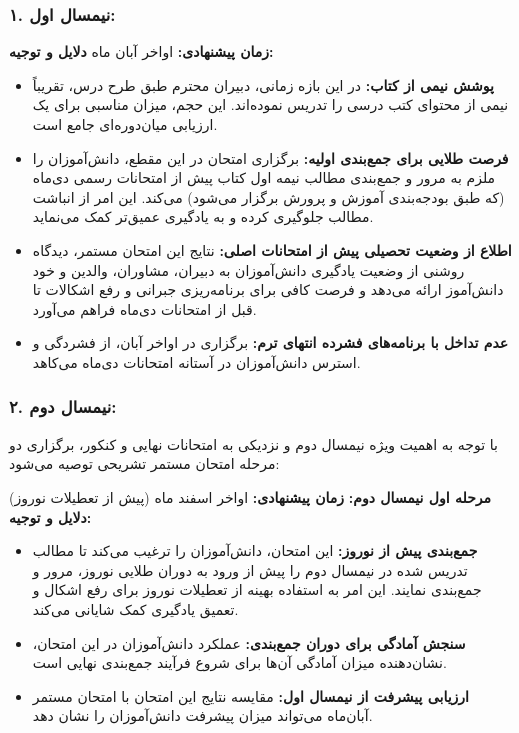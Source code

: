 \documentclass[a4paper,14pt]{article}
\begin{document}
\subsubsection*{۱. نیمسال اول:}
\textbf{زمان پیشنهادی:} اواخر آبان ماه
\newline\textbf{دلایل و توجیه:}
\begin{itemize}
    \item \textbf{پوشش نیمی از کتاب:}  در این بازه زمانی، دبیران محترم طبق طرح درس، تقریباً نیمی از محتوای کتب درسی را تدریس نموده‌اند. این حجم، میزان مناسبی برای یک ارزیابی میان‌دوره‌ای جامع است.
    \item \textbf{فرصت طلایی برای جمع‌بندی اولیه:} برگزاری امتحان در این مقطع، دانش‌آموزان را ملزم به مرور و جمع‌بندی مطالب نیمه اول کتاب پیش از امتحانات رسمی دی‌ماه (که طبق بودجه‌بندی آموزش و پرورش برگزار می‌شود) می‌کند. این امر از انباشت مطالب جلوگیری کرده و به یادگیری عمیق‌تر کمک می‌نماید.
    \item \textbf{اطلاع از وضعیت تحصیلی پیش از امتحانات اصلی:} نتایج این امتحان مستمر، دیدگاه روشنی از وضعیت یادگیری دانش‌آموزان به دبیران، مشاوران، والدین و خود دانش‌آموز ارائه می‌دهد و فرصت کافی برای برنامه‌ریزی جبرانی و رفع اشکالات تا قبل از امتحانات دی‌ماه فراهم می‌آورد.
    \item \textbf{عدم تداخل با برنامه‌های فشرده انتهای ترم:} برگزاری در اواخر آبان، از فشردگی و استرس دانش‌آموزان در آستانه امتحانات دی‌ماه می‌کاهد.
\end{itemize}
\medskip

\subsubsection*{۲. نیمسال دوم:}
با توجه به اهمیت ویژه نیمسال دوم و نزدیکی به امتحانات نهایی و کنکور، برگزاری دو مرحله امتحان مستمر تشریحی توصیه می‌شود:
\medskip

\textbf{مرحله اول نیمسال دوم:}
\newline\textbf{زمان پیشنهادی:} اواخر اسفند ماه (پیش از تعطیلات نوروز)
\newline\textbf{دلایل و توجیه:}
\begin{itemize}
    \item \textbf{جمع‌بندی پیش از نوروز:} این امتحان، دانش‌آموزان را ترغیب می‌کند تا مطالب تدریس شده در نیمسال دوم را پیش از ورود به دوران طلایی نوروز، مرور و جمع‌بندی نمایند. این امر به استفاده بهینه از تعطیلات نوروز برای رفع اشکال و تعمیق یادگیری کمک شایانی می‌کند.
    \item \textbf{سنجش آمادگی برای دوران جمع‌بندی:} عملکرد دانش‌آموزان در این امتحان، نشان‌دهنده میزان آمادگی آن‌ها برای شروع فرآیند جمع‌بندی نهایی است.
    \item \textbf{ارزیابی پیشرفت از نیمسال اول:} مقایسه نتایج این امتحان با امتحان مستمر آبان‌ماه می‌تواند میزان پیشرفت دانش‌آموزان را نشان دهد.
\end{itemize}
\medskip
\end{document}
